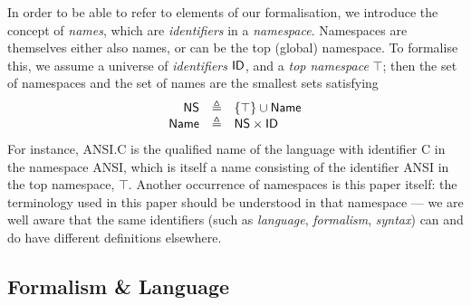 \begin{newdef}
In order to be able to refer to elements of our formalisation, we introduce the concept of \emph{names}, which are \emph{identifiers} in a \emph{namespace}. Namespaces are themselves either also names, or can be the top (global) namespace. To formalise this, we assume a universe of \emph{identifiers} $\mathsf{ID}$, and a \emph{top namespace} $\top$; then the set of namespaces \NS and the set of names \Name are the smallest sets satisfying
\[\begin{array}{rcl}
\mathsf{NS} & \triangleq & \{\top\} \cup \mathsf{Name} \\
\mathsf{Name} & \triangleq & \mathsf{NS} \times \mathsf{ID}
\end{array}\]
For instance, \textsf{ANSI.C} is the qualified name of the language with identifier \textsf{C} in the namespace \textsf{ANSI}, which is itself a name consisting of the identifier \textsf{ANSI} in the top namespace, $\top$. Another occurrence of namespaces is this paper itself: the terminology used in this paper should be understood in that namespace --- we are well aware that the same identifiers (such as \textit{language}, \textit{formalism}, \textit{syntax}) can and do have different definitions elsewhere.
\end{newdef}

\subsection{Formalism \& Language}
\label{sec:Formalism-Language}

